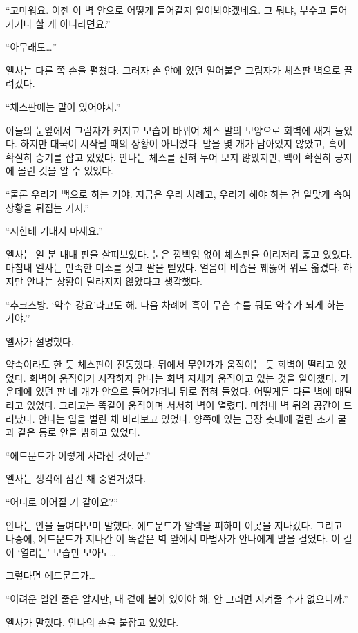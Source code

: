 ``고마워요. 이젠 이 벽 안으로 어떻게 들어갈지 알아봐야겠네요. 그 뭐냐, 부수고 들어가거나 할 게 아니라면요.''

``아무래도\ldots''

엘사는 다른 쪽 손을 펼쳤다. 그러자 손 안에 있던 얼어붙은 그림자가 체스판 벽으로 끌려갔다.

``체스판에는 말이 있어야지.''

이들의 눈앞에서 그림자가 커지고 모습이 바뀌어 체스 말의 모양으로 회벽에 새겨 들었다. 하지만 대국이 시작될 때의 상황이 아니었다. 말을 몇 개가 남아있지 않았고, 흑이 확실히 승기를 잡고 있었다. 안나는 체스를 전혀 두어 보지 않았지만, 백이 확실히 궁지에 몰린 것을 알 수 있었다.

``물론 우리가 백으로 하는 거야. 지금은 우리 차례고, 우리가 해야 하는 건 알맞게 속여 상황을 뒤집는 거지.''

`` 저한테 기대지 마세요.''

엘사는 일 분 내내 판을 살펴보았다. 눈은 깜빡임 없이 체스판을 이리저리 훑고 있었다. 마침내 엘사는 만족한 미소를 짓고 팔을 뻗었다. 얼음이 비숍을 꿰뚫어 위로 옮겼다. 하지만 안나는 상황이 달라지지 않았다고 생각했다.

``추크츠방. `악수 강요'라고도 해. 다음 차례에 흑이 무슨 수를 둬도 악수가 되게 하는 거야.''

엘사가 설명했다.

약속이라도 한 듯 체스판이 진동했다. 뒤에서 무언가가 움직이는 듯 회벽이 떨리고 있었다. 회벽이 움직이기 시작하자 안나는 회벽 자체가 움직이고 있는 것을 알아챘다. 가운데에 있던 판 네 개가 안으로 들어가더니 뒤로 접혀 들었다. 어떻게든 다른 벽에 매달리고 있었다. 그러고는 똑같이 움직이며 서서히 벽이 열렸다. 마침내 벽 뒤의 공간이 드러났다. 안나는 입을 벌린 채 바라보고 있었다. 양쪽에 있는 금장 촛대에 걸린 초가 굴과 같은 통로 안을 밝히고 있었다.

``에드문드가 이렇게 사라진 것이군.''

엘사는 생각에 잠긴 채 중얼거렸다.

``어디로 이어질 거 같아요?''

안나는 안을 들여다보며 말했다. 에드문드가 알렉을 피하며 이곳을 지나갔다. 그리고 나중에, 에드문드가 지나간 이 똑같은 벽 앞에서 마법사가 안나에게 말을 걸었다. 이 길이 `열리는' 모습만 보아도\ldots

그렇다면 에드문드가\ldots

``어려운 일인 줄은 알지만, 내 곁에 붙어 있어야 해. 안 그러면 지켜줄 수가 없으니까.''

엘사가 말했다. 안나의 손을 붙잡고 있었다.

